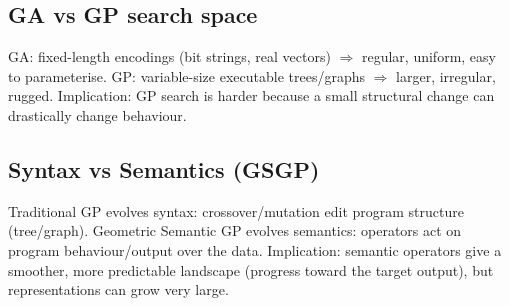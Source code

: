 \subsection*{GA vs GP search space}
GA: fixed-length encodings (bit strings, real vectors) \(\Rightarrow\) regular, uniform, easy to parameterise. GP: variable-size executable trees/graphs \(\Rightarrow\) larger, irregular, rugged. Implication: GP search is harder because a small structural change can drastically change behaviour.

\subsection*{Syntax vs Semantics (GSGP)}
Traditional GP evolves syntax: crossover/mutation edit program structure (tree/graph). Geometric Semantic GP evolves semantics: operators act on program behaviour/output over the data. Implication: semantic operators give a smoother, more predictable landscape (progress toward the target output), but representations can grow very large.
